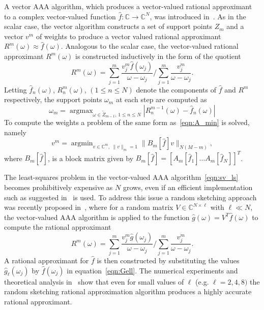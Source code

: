 \documentclass[11pt]{article}
\theoremstyle{plain}
\theoremstyle{remark}
\def \C{\mathbb{C}}
\DeclareMathOperator*{\argmax}{argmax}
\DeclareMathOperator*{\argmin}{argmin}
\begin{document}
A vector AAA algorithm, which produces a vector-valued rational
approximant to a complex vector-valued function $\widehat{f}:\C \to \C^N$, was
introduced in~\cite{lietaert2022automatic}. As in the scalar case, the
vector algorithm constructs a set of support points $Z_m$ and a
vector $v^m$ of weights to produce a vector valued
rational approximant $R^m(\omega) \approx \widehat{f}(\omega)$. Analogous to
the scalar case, the vector-valued rational approximant $R^m(\omega)$ is
constructed inductively in the form of the  quotient
\begin{equation}\label{eqn:rat_approx_vec}
    R^m(\omega) = \sum_{j=1}^m \frac{v^m_j \widehat{f}(\omega_j)}{\omega - \omega_j} \bigg/   \sum_{j=1}^{m} \frac{v^m_j}{\omega - \omega_j}.
\end{equation}
 Letting $\widehat{f}_n(\omega)$, $R^m_n(\omega)$, $(1 \le n \le N)$ denote the components of $\widehat{f}$ and $R^m$ respectively, the support points $\omega_m$ at each step are computed as
\begin{equation*}
   \omega_m = \argmax_{\omega\in \widetilde{Z}_{m-1},\, 1 \le n \le N} |R_n^{m-1}(\omega) - \widehat{f}_n(\omega)|
\end{equation*} 
To compute the weights a problem of the same form as~\eqref{eqn:A_min}
is solved, namely
\begin{equation}\label{eqn:sv_ls}
     v^{m} =  \argmin_{v\in \mathbb{C}^m,\; \parallel v\parallel_m = 1}\parallel B_m[\widehat{f}]v\parallel_{N(M-m)},
\end{equation}
where $B_m[\widehat{f}]$, is a block matrix given by $B_m[\widehat{f}]= [A_m[\widehat{f}_1] \dots A_m[\widehat{f}_N]]^T$. 

The least-squares problem in the vector-valued AAA
algorithm~\eqref{eqn:sv_ls} becomes prohibitively expensive as $N$
grows, even if an efficient implementation such as suggested
in~\cite{lietaert2022automatic} is used. To address this issue a
random sketching approach was recently proposed
in~\cite{guttel2024randomized}, where for a random matrix
$V \in \C^{N\times \ell}$ with $\ell \ll N$, the vector-valued AAA
algorithm is applied to the function $\widehat{g}(\omega) = V^T\widehat{f}(\omega)$ to compute the rational approximant
\begin{equation}\label{eqn:Gell}
    R^m(\omega) = \sum_{j=1}^m \frac{v^m_j \widehat{g}(\omega_j)}{\omega - \omega_j} \bigg/   \sum_{j=1}^{m} \frac{v^m_j}{\omega - \omega_j}.
  \end{equation}
A rational approximant for $\widehat{f}$ is then constructed by substituting the values $\widehat{g}_\ell(\omega_j)$ by $\widehat{f}(\omega_j)$ in equation~\eqref{eqn:Gell}. The numerical experiments and
theoretical analysis in~\cite{guttel2024randomized} show that even for
small values of $\ell$ (e.g. $\ell = 2,4,8)$ the random sketching
rational approximation algorithm produces a highly accurate rational
approximant.
\end{document}
